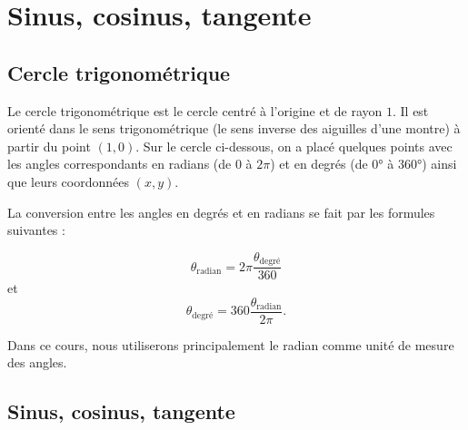 \documentclass[11pt,class=report,crop=false]{standalone}
\begin{document}






\section{Sinus, cosinus, tangente}

\subsection{Cercle trigonométrique}


Le cercle trigonométrique est le cercle centré à l'origine et de rayon $1$.
Il est orienté dans le sens trigonométrique (le sens inverse des aiguilles d'une montre) à partir du point $(1,0)$. Sur le cercle ci-dessous, on a placé quelques points avec les angles correspondants en radians (de $0$ à $2 \pi$) et en degrés (de $\ang{0}$ à $\ang{360}$) ainsi que leurs coordonnées $(x,y)$.
 



La conversion entre les angles en degrés et en radians se fait par les formules suivantes :

$$\theta_{\text{radian}} = 2\pi \frac{\theta_{\text{degré}}}{360}$$
et
$$\theta_{\text{degré}} = 360 \frac{\theta_{\text{radian}}}{2\pi}.$$

Dans ce cours, nous utiliserons principalement le radian comme unité de mesure des angles.


\subsection{Sinus, cosinus, tangente}
\end{document}
